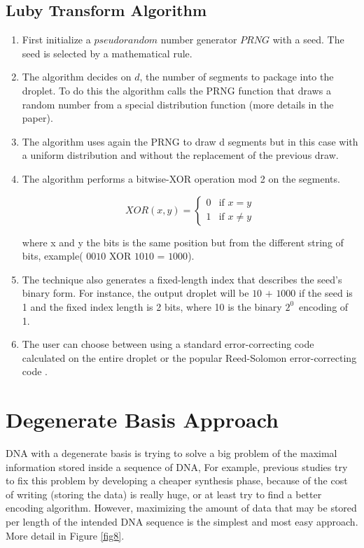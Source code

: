 \documentclass[10pt,twocolumn,twoside]{gsajnl}
\theoremstyle{definition}
\begin{document}
\subsection{Luby Transform Algorithm}
\begin{enumerate}

    \item First initialize a $pseudorandom$ number generator $PRNG$ with a seed. The seed is selected by a mathematical rule.
    \item The algorithm decides on $d$, the number of segments to package into the droplet. To do this the algorithm calls the PRNG function that draws a random number from a special distribution function (more details in the paper).

    \item The algorithm uses again the PRNG to draw d segments but in this case with a uniform distribution and without the replacement of the previous draw.

    \item The algorithm performs a bitwise-XOR operation mod 2 on the segments.
        \begin{center}
            \[ XOR(x,y) =
                \begin{cases}
                    0 & \text{if } x = y\\
                    1 & \text{if } x \ne y
                \end{cases}
            \]
        \end{center}
    where x and y the bits is the same position but from the different string of bits, example( $0010$ XOR $1010$ = $1000$).

    \item The technique also generates a fixed-length index that describes the seed's binary form. For instance, the output droplet will be $10$ $+$ $1000$ if the seed is 1 and the fixed index length is 2 bits, where 10 is the binary $2^{0}$ encoding of 1.

    \item The user can choose between using a standard error-correcting code calculated on the entire droplet or the popular Reed-Solomon error-correcting code \cite{erlich2017dna}.
\end{enumerate}

\section{Degenerate Basis Approach}
DNA with a degenerate basis is trying to solve a big problem of the maximal information stored inside a sequence of DNA, For example, previous studies try to fix this problem by developing a cheaper synthesis phase, because of the cost of writing (storing the data) is really huge, or at least try to find a better encoding algorithm. However, maximizing the amount of data that may be stored per length of the intended DNA sequence is the simplest and most easy approach. More detail in Figure \ref{fig8}. 
\end{document}
